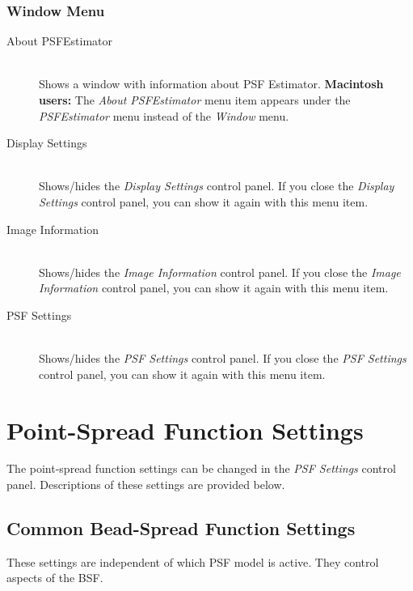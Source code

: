 \documentclass[11pt,titlepage,twoside]{article}
\begin{document}
\subsubsection{Window Menu}

\begin{description}

  \item[About PSFEstimator] \hfill \\
  Shows a window with information about PSF Estimator. \textbf{Macintosh users:} The \emph{About PSFEstimator} menu item appears under the \emph{PSFEstimator} menu instead of the \emph{Window} menu. 

  \item[Display Settings] \hfill \\
  Shows/hides the \emph{Display Settings} control panel. If you close the \emph{Display Settings} control panel, you can show it again with this menu item.
  
  \item[Image Information] \hfill \\
    Shows/hides the \emph{Image Information} control panel. If you close the \emph{Image Information} control panel, you can show it again with this menu item.
  
  \item[PSF Settings] \hfill \\
  Shows/hides the \emph{PSF Settings} control panel. If you close the \emph{PSF Settings} control panel, you can show it again with this menu item.

\end{description}

\section{Point-Spread Function Settings}
\label{sec:PointSpreadFunctionSettings}

The point-spread function settings can be changed in the \emph{PSF Settings} control panel. Descriptions of these settings are provided below.

\subsection{Common Bead-Spread Function Settings}
\label{sec:CommonBeadSpreadFunctionSettings}

These settings are independent of which PSF model is active. They control aspects of the BSF.
\end{document}
